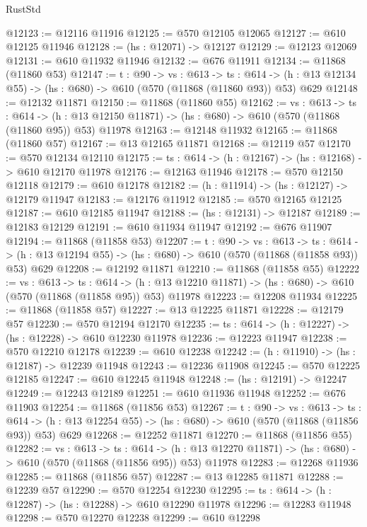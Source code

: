 \begin{lexlean}{RustStd}
\begin{coremodule}
@12123 := @12116 @11916
@12125 := @570 @12105 @12065
@12127 := @610 @12125 @11946
@12128 := (hs : @12071) -> @12127
@12129 := @12123 @12069
@12131 := @610 @11932 @11946
@12132 := @676 @11911
@12134 := @11868 (@11860 @53)
@12147 := {t : @90} ->
  {vs : @613} ->
  {ts : @614} -> (h : @13 @12134 @55) -> (hs : @680) -> @610 (@570 (@11868 (@11860 @93)) @53) @629
@12148 := @12132 @11871
@12150 := @11868 (@11860 @55)
@12162 := {vs : @613} ->
  {ts : @614} ->
  (h : @13 @12150 @11871) -> (hs : @680) -> @610 (@570 (@11868 (@11860 @95)) @53) @11978
@12163 := @12148 @11932
@12165 := @11868 (@11860 @57)
@12167 := @13 @12165 @11871
@12168 := @12119 @57
@12170 := @570 @12134 @12110
@12175 := {ts : @614} -> (h : @12167) -> (hs : @12168) -> @610 @12170 @11978
@12176 := @12163 @11946
@12178 := @570 @12150 @12118
@12179 := @610 @12178
@12182 := (h : @11914) -> (hs : @12127) -> @12179 @11947
@12183 := @12176 @11912
@12185 := @570 @12165 @12125
@12187 := @610 @12185 @11947
@12188 := (hs : @12131) -> @12187
@12189 := @12183 @12129
@12191 := @610 @11934 @11947
@12192 := @676 @11907
@12194 := @11868 (@11858 @53)
@12207 := {t : @90} ->
  {vs : @613} ->
  {ts : @614} -> (h : @13 @12194 @55) -> (hs : @680) -> @610 (@570 (@11868 (@11858 @93)) @53) @629
@12208 := @12192 @11871
@12210 := @11868 (@11858 @55)
@12222 := {vs : @613} ->
  {ts : @614} ->
  (h : @13 @12210 @11871) -> (hs : @680) -> @610 (@570 (@11868 (@11858 @95)) @53) @11978
@12223 := @12208 @11934
@12225 := @11868 (@11858 @57)
@12227 := @13 @12225 @11871
@12228 := @12179 @57
@12230 := @570 @12194 @12170
@12235 := {ts : @614} -> (h : @12227) -> (hs : @12228) -> @610 @12230 @11978
@12236 := @12223 @11947
@12238 := @570 @12210 @12178
@12239 := @610 @12238
@12242 := (h : @11910) -> (hs : @12187) -> @12239 @11948
@12243 := @12236 @11908
@12245 := @570 @12225 @12185
@12247 := @610 @12245 @11948
@12248 := (hs : @12191) -> @12247
@12249 := @12243 @12189
@12251 := @610 @11936 @11948
@12252 := @676 @11903
@12254 := @11868 (@11856 @53)
@12267 := {t : @90} ->
  {vs : @613} ->
  {ts : @614} -> (h : @13 @12254 @55) -> (hs : @680) -> @610 (@570 (@11868 (@11856 @93)) @53) @629
@12268 := @12252 @11871
@12270 := @11868 (@11856 @55)
@12282 := {vs : @613} ->
  {ts : @614} ->
  (h : @13 @12270 @11871) -> (hs : @680) -> @610 (@570 (@11868 (@11856 @95)) @53) @11978
@12283 := @12268 @11936
@12285 := @11868 (@11856 @57)
@12287 := @13 @12285 @11871
@12288 := @12239 @57
@12290 := @570 @12254 @12230
@12295 := {ts : @614} -> (h : @12287) -> (hs : @12288) -> @610 @12290 @11978
@12296 := @12283 @11948
@12298 := @570 @12270 @12238
@12299 := @610 @12298

\end{coremodule}
\end{lexlean}
